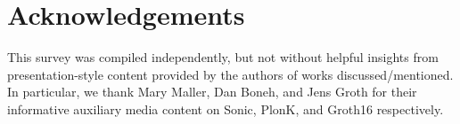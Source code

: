 \section*{Acknowledgements}

\noindent This survey was compiled independently, but not without helpful insights from presentation-style content provided by the authors of works discussed/mentioned. In particular, we thank Mary Maller, Dan Boneh, and Jens Groth for their informative auxiliary media content on Sonic, PlonK, and Groth16 respectively. 
